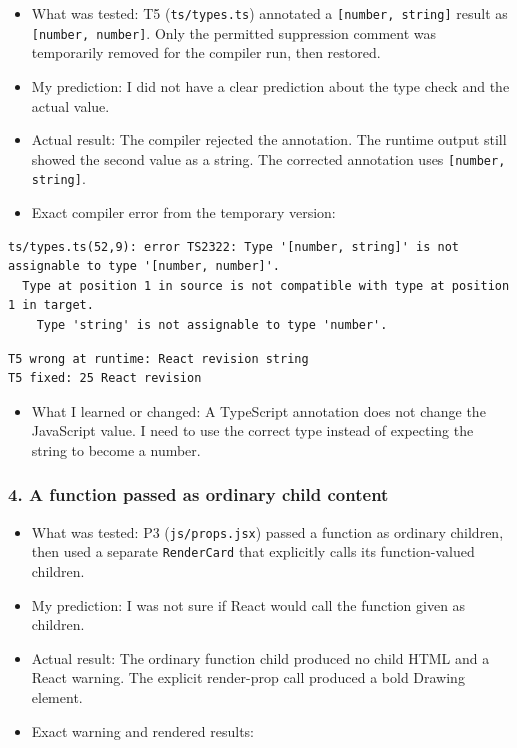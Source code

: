 \documentclass[
  11pt,
]{article}
\newcommand{\passthrough}[1]{#1}
\providecommand{\tightlist}{%
  \setlength{\itemsep}{0pt}\setlength{\parskip}{0pt}}
\begin{document}
\begin{itemize}
\tightlist
\item
  What was tested: T5 (\passthrough{\lstinline!ts/types.ts!}) annotated
  a \passthrough{\lstinline![number, string]!} result as
  \passthrough{\lstinline![number, number]!}. Only the permitted
  suppression comment was temporarily removed for the compiler run, then
  restored.
\item
  My prediction: I did not have a clear prediction about the type check
  and the actual value.
\item
  Actual result: The compiler rejected the annotation. The runtime
  output still showed the second value as a string. The corrected
  annotation uses \passthrough{\lstinline![number, string]!}.
\item
  Exact compiler error from the temporary version:
\end{itemize}

\begin{lstlisting}
ts/types.ts(52,9): error TS2322: Type '[number, string]' is not assignable to type '[number, number]'.
  Type at position 1 in source is not compatible with type at position 1 in target.
    Type 'string' is not assignable to type 'number'.
\end{lstlisting}

\begin{lstlisting}
T5 wrong at runtime: React revision string
T5 fixed: 25 React revision
\end{lstlisting}

\begin{itemize}
\tightlist
\item
  What I learned or changed: A TypeScript annotation does not change the
  JavaScript value. I need to use the correct type instead of expecting
  the string to become a number.
\end{itemize}

\subsubsection{4. A function passed as ordinary child
content}\label{a-function-passed-as-ordinary-child-content}

\begin{itemize}
\tightlist
\item
  What was tested: P3 (\passthrough{\lstinline!js/props.jsx!}) passed a
  function as ordinary children, then used a separate
  \passthrough{\lstinline!RenderCard!} that explicitly calls its
  function-valued children.
\item
  My prediction: I was not sure if React would call the function given
  as children.
\item
  Actual result: The ordinary function child produced no child HTML and
  a React warning. The explicit render-prop call produced a bold Drawing
  element.
\item
  Exact warning and rendered results:
\end{itemize}
\end{document}
